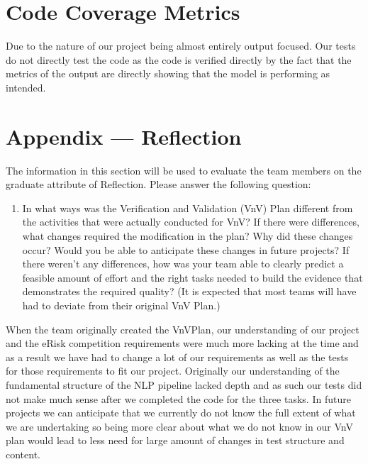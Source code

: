 \documentclass[12pt, titlepage]{article}
\begin{document}
\section{Code Coverage Metrics}
Due to the nature of our project being almost entirely output focused. Our tests do not directly test the code as the code is verified directly by the fact that the metrics of the output are directly showing that the model is performing as intended.




\newpage{}
\section*{Appendix --- Reflection}

The information in this section will be used to evaluate the team members on the
graduate attribute of Reflection.  Please answer the following question:

\begin{enumerate}
  \item In what ways was the Verification and Validation (VnV) Plan different
  from the activities that were actually conducted for VnV?  If there were
  differences, what changes required the modification in the plan?  Why did
  these changes occur?  Would you be able to anticipate these changes in future
  projects?  If there weren't any differences, how was your team able to clearly
  predict a feasible amount of effort and the right tasks needed to build the
  evidence that demonstrates the required quality?  (It is expected that most
  teams will have had to deviate from their original VnV Plan.)
\end{enumerate}

When the team originally created the VnVPlan, our understanding of our project and the eRisk competition requirements were much more lacking at the time and as a result we have had to change a lot of our requirements as well as the tests for those requirements to fit our project. Originally our understanding of the fundamental structure of the NLP pipeline lacked depth and as such our tests did not make much sense after we completed the code for the three tasks. In future projects we can anticipate that we currently do not know the full extent of what we are undertaking so being more clear about what we do not know in our VnV plan would lead to less need for large amount of changes in test structure and content.
\end{document}
